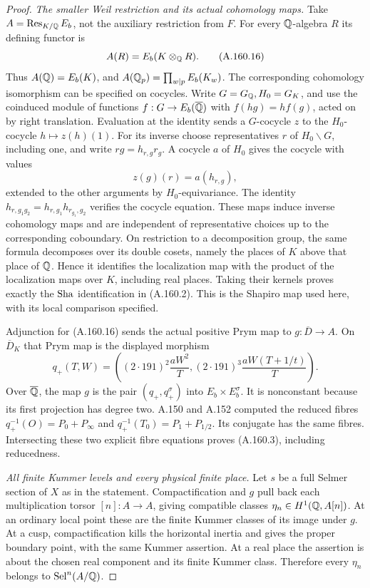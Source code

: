 \begin{proof}
\emph{The smaller Weil restriction and its actual cohomology maps.}
Take \(A=\operatorname{Res}_{K/\mathbb Q}E_b\), not the auxiliary
restriction from \(F\).  For every \(\mathbb Q\)-algebra \(R\)
its defining functor is
\[
                     A(R)=E_b(K\otimes_\mathbb Q R).
\tag{A.160.16}
\]
Thus \(A(\mathbb Q)=E_b(K)\), and
\(A(\mathbb Q_p)=\prod_{w\mid p}E_b(K_w)\).
The corresponding cohomology isomorphism can be specified
on cocycles.  Write \(G=G_\mathbb Q,H_0=G_K\), and use the
coinduced module of functions \(f:G\to E_b(\overline{\mathbb Q})\)
with \(f(hg)=hf(g)\), acted on by right translation.
Evaluation at the identity sends a \(G\)-cocycle \(z\)
to the \(H_0\)-cocycle \(h\mapsto z(h)(1)\).
For its inverse choose representatives \(r\) of
\(H_0\backslash G\), including one, and write
\(rg=h_{r,g}r_g\).  A cocycle \(a\) of \(H_0\)
gives the cocycle with values
\[
                            z(g)(r)=a(h_{r,g}),
\tag{A.160.17}
\]
extended to the other arguments by \(H_0\)-equivariance.
The identity
\(h_{r,g_1g_2}=h_{r,g_1}h_{r_{g_1},g_2}\)
verifies the cocycle equation.  These maps induce inverse
cohomology maps and are independent of representative
choices up to the corresponding coboundary.
On restriction to a decomposition group, the same formula
decomposes over its double cosets, namely the places of
\(K\) above that place of \(\mathbb Q\).  Hence it identifies
the localization map with the product of the localization
maps over \(K\), including real places.  Taking their
kernels proves exactly the \(\operatorname{Sha}\) identification in
(A.160.2).  This is the Shapiro map used here, with its
local comparison specified.

Adjunction for (A.160.16) sends the actual positive Prym
map to \(g:\overline D\to A\).  On \(\overline D_K\)
that Prym map is the displayed morphism
\[
 q_+(T,W)=\left((2\cdot191)^2\frac{aW^2}{T},
          (2\cdot191)^3\frac{aW(T+1/t)}{T}\right).
\tag{A.160.18}
\]
Over \(\overline{\mathbb Q}\), the map \(g\) is the pair
\((q_+,q_+^\sigma)\) into \(E_b\times E_b^\sigma\).
It is nonconstant because its first projection has degree
two.  A.150 and A.152 computed the reduced fibres
\(q_+^{-1}(O)=P_0+P_\infty\) and
\(q_+^{-1}(T_0)=P_1+P_{1/2}\).  Its conjugate has the
same fibres.  Intersecting these two explicit fibre
equations proves (A.160.3), including reducedness.

\emph{All finite Kummer levels and every physical finite place.}
Let \(s\) be a full Selmer section of \(X\) as in the
statement.  Compactification and \(g\) pull back each
multiplication torsor \([n]:A\to A\), giving compatible
classes \(\eta_n\in H^1(\mathbb Q,A[n])\).  At an ordinary
local point these are the finite Kummer classes of its
image under \(g\).  At a cusp, compactification kills
the horizontal inertia and gives the proper boundary
point, with the same Kummer assertion.  At a real place
the assertion is about the chosen real component and its
finite Kummer class.  Therefore every \(\eta_n\) belongs
to \(\operatorname{Sel}^n(A/\mathbb Q)\).


\end{proof}
